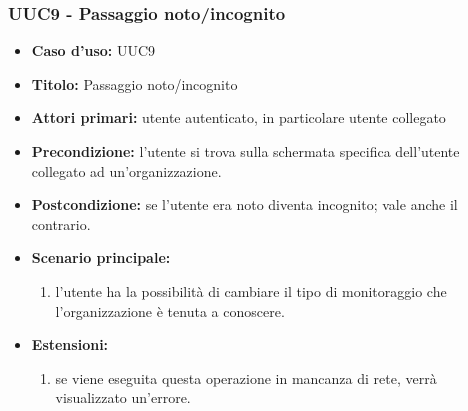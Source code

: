 \documentclass[casi-duso]{subfiles}
\begin{document}
\subsubsection{UUC9 - Passaggio noto/incognito}
\label{subsub:UUC9utente}
\begin{itemize}
  \item \textbf{Caso d’uso:} UUC9
  \item \textbf{Titolo:} Passaggio noto/incognito
  \item \textbf{Attori primari:} utente autenticato, in particolare utente collegato
  \item \textbf{Precondizione:} l'utente si trova sulla schermata specifica dell'utente collegato ad un'organizzazione.
  \item \textbf{Postcondizione:} se l'utente era noto diventa incognito; vale anche il contrario.
  \item \textbf{Scenario principale:} 
  \begin{enumerate}
    \item l'utente ha la possibilità di cambiare il tipo di monitoraggio che l'organizzazione è tenuta a conoscere.
  \end{enumerate}  
  \item \textbf{Estensioni:} 
  \begin{enumerate}
    \item se viene eseguita questa operazione in mancanza di rete, verrà visualizzato un'errore. 
  \end{enumerate}  
\end{itemize}

\end{document}
